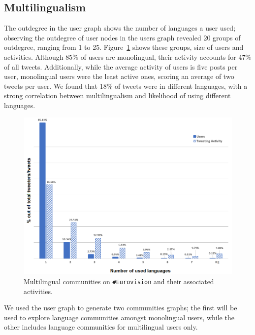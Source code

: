 \documentclass{llncs}
\begin{document}
\subsection{Multilingualism}

The outdegree in the user graph shows the number of languages a user
used; observing the outdegree of user nodes in the users graph revealed 20
groups of outdegree, ranging from 1 to
25. Figure~\ref{fig:multilingual} shows these groups, size of users
and activities. Although 85\% of users are monolingual, their
activity accounts for 47\% of all tweets. Additionally, while the
average activity of users is five posts per user, monolingual users
were the least active ones, scoring an average of two tweets per
user. We found that 18\% of tweets were in different languages, with a
strong correlation between multilingualism and likelihood of using
different languages.

\begin{figure}[htb]
\centering
\includegraphics[width=0.9\columnwidth]{images/multilingualcommunities.png}
\caption{Multilingual communities on {\texttt{\#Eurovision}} and their associated activities.}
\label{fig:multilingual}
\end{figure}

We used the user graph to generate two communities graphs; the first
will be used to explore language communities amongst monolingual
users, while the other includes language communities for multilingual
users only.

\end{document}

